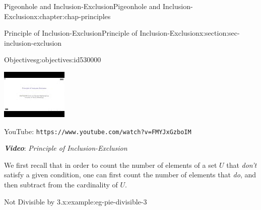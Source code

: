 \documentclass[oneside,10pt,]{book}
\newcommand{\mono}[1]{\texttt{#1}}
\newcommand{\alert}[1]{\textbf{\textit{#1}}}
\numberwithin{equation}{section}
\newlength{\qrsize}
\newlength{\previewwidth}
\begin{document}
\begin{chapterptx}{Pigeonhole and Inclusion-Exclusion}{}{Pigeonhole and Inclusion-Exclusion}{}{}{x:chapter:chap-principles}
\begin{sectionptx}{Principle of Inclusion-Exclusion}{}{Principle of Inclusion-Exclusion}{}{}{x:section:sec-inclusion-exclusion}
\begin{objectives}{Objectives}{g:objectives:id530000}
\begin{itemize}[label=\textbullet]
\end{itemize}
\end{objectives}
\begin{sidebyside}{1}{0}{0}{0}%
\begin{sbspanel}{1}%
\setlength{\qrsize}{9em}
\setlength{\previewwidth}{\linewidth}
\addtolength{\previewwidth}{-\qrsize}
\begin{tcbraster}[raster columns=2, raster column skip=1pt, raster halign=center, raster force size=false, raster left skip=0pt, raster right skip=0pt]%
\begin{tcolorbox}[previewstyle, width=\previewwidth]%
\includegraphics[width=0.80\linewidth,height=\qrsize,keepaspectratio]{images/video-inclusion-exclusion.jpg}%
\end{tcolorbox}%
\begin{tcolorbox}[qrstyle]%
{\hypersetup{urlcolor=black}}%
\end{tcolorbox}%
\begin{tcolorbox}[captionstyle]%
\small YouTube: \mono{https://www.youtube.com/watch?v=FMYJxGzboIM}\end{tcolorbox}%
\end{tcbraster}%
\end{sbspanel}%
\end{sidebyside}%
\par
\alert{Video}: \emph{Principle of Inclusion-Exclusion}%
\par
We first recall that in order to count the number of elements of a set \(U\) that \emph{don't} satisfy a given condition, one can first count the number of elements that \emph{do}, and then subtract from the cardinality of \(U\).%
\begin{example}{Not Divisible by 3.}{x:example:eg-pie-divisible-3}%

\end{example}
\end{sectionptx}
\end{chapterptx}
\end{document}
